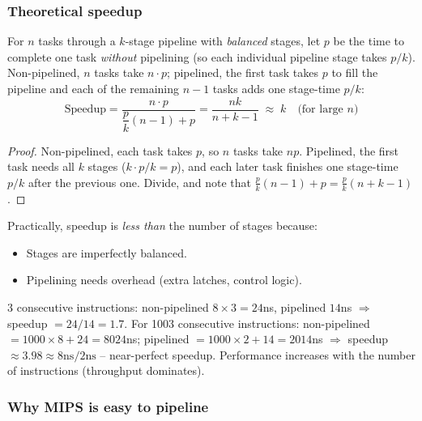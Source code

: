 \subsubsection{Theoretical speedup}

\begin{theorem}
For $n$ tasks through a $k$-stage pipeline with \emph{balanced} stages, let
$p$ be the time to complete one task \emph{without} pipelining (so each
individual pipeline stage takes $p/k$). Non-pipelined, $n$ tasks take
$n\cdot p$; pipelined, the first task takes $p$ to fill the pipeline and
each of the remaining $n-1$ tasks adds one stage-time $p/k$:
\[
  \text{Speedup} = \frac{n \cdot p}{\dfrac{p}{k}(n-1) + p}
  = \frac{nk}{n+k-1}
  \;\approx\; k
  \quad \text{(for large $n$)}
\]
\end{theorem}

\begin{proof}
Non-pipelined, each task takes $p$, so $n$ tasks take $np$. Pipelined, the
first task needs all $k$ stages ($k\cdot p/k = p$), and each later task
finishes one stage-time $p/k$ after the previous one. Divide, and note that
$\frac{p}{k}(n-1)+p = \frac{p}{k}(n+k-1)$.
\end{proof}

Practically, speedup is \emph{less than} the number of stages because:
\begin{itemize}
  \item Stages are imperfectly balanced.
  \item Pipelining needs overhead (extra latches, control logic).
\end{itemize}

\begin{eg}
3 consecutive instructions: non-pipelined
$8\times3=24$ns, pipelined $14$ns $\Rightarrow$ speedup $=24/14=1.7$.
For 1003 consecutive instructions: non-pipelined $=1000\times8+24=8024$ns;
pipelined $=1000\times2+14=2014$ns $\Rightarrow$ speedup $\approx 3.98 \approx
8\text{ns}/2\text{ns}$ -- near-perfect speedup. Performance increases with the
number of instructions (throughput dominates).
\end{eg}

\subsubsection{Why MIPS is easy to pipeline}

